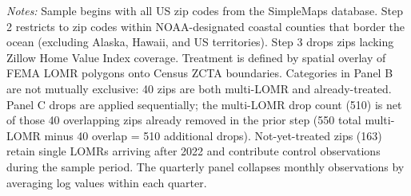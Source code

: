 \begin{table}[!htbp]
\begin{threeparttable}
\begin{tablenotes}
\item \textit{Notes:} Sample begins with all US zip codes from the SimpleMaps database. Step 2 restricts to zip codes within NOAA-designated coastal counties that border the ocean (excluding Alaska, Hawaii, and US territories). Step 3 drops zips lacking Zillow Home Value Index coverage. Treatment is defined by spatial overlay of FEMA LOMR polygons onto Census ZCTA boundaries. Categories in Panel B are not mutually exclusive: 40 zips are both multi-LOMR and already-treated. Panel C drops are applied sequentially; the multi-LOMR drop count (510) is net of those 40 overlapping zips already removed in the prior step (550 total multi-LOMR minus 40 overlap = 510 additional drops). Not-yet-treated zips (163) retain single LOMRs arriving after 2022 and contribute control observations during the sample period. The quarterly panel collapses monthly observations by averaging log values within each quarter.
\end{tablenotes}
\end{threeparttable}
\end{table}
